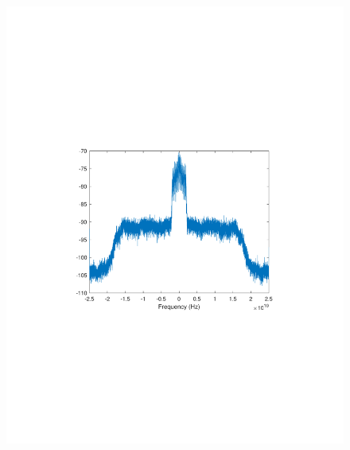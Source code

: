 \begin{refsection}
\begin{figure}[H]
	\centering
	\begin{minipage}{0.30\textwidth}
		\centering
		\includegraphics[clip, trim=4cm 8cm 4cm 8cm, width=1\textwidth]{./sdf/m_qam_system/figures/expResults/homodyne/0_4GBdInSig13dBc_bfFec.pdf}
		\label{fig:4GBdEyeBefFecHm}
	\end{minipage}
	\begin{minipage}{0.30\textwidth}
		\centering

\end{minipage}
\end{figure}
\end{refsection}
